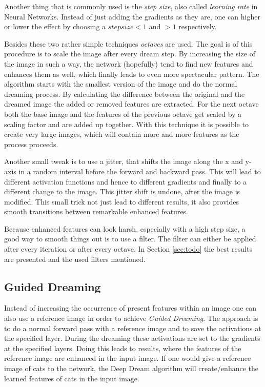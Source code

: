 Another thing that is commonly used is the \emph{step size}, also called \emph{learning rate} in Neural Networks.
Instead of just adding the gradients as they are, one can higher or lower the effect by choosing a $step size < 1$ and $> 1$ respectively.

Besides these two rather simple techniques \emph{octaves} are used.
The goal is of this procedure is to scale the image after every dream step.
By increasing the size of the image in such a way, the network (hopefully) tend to find new features and enhances them as well, which finally leads to even more spectacular pattern.
The algorithm starts with the smallest version of the image and do the normal dreaming process.
By calculating the difference between the original and the dreamed image the added or removed features are extracted.
For the next octave both the base image and the features of the previous octave get scaled by a scaling factor and are added up together.
With this technique it is possible to create very large images, which will contain more and more features as the process proceeds.

 
Another small tweak is to use a jitter, that shifts the image along the x and y-axis in a random interval before the forward and backward pass.
This will lead to different activation functions and hence to different gradients and finally to a different change to the image.
This jitter shift is undone, after the image is modified.
This small trick not just lead to different results, it also provides smooth transitions between remarkable enhanced features.

Because enhanced features can look harsh, especially with a high step size, a good way to smooth things out is to use a filter. The filter can either be applied after every iteration or after every octave.
In Section \ref{sec:todo} the best results are presented and the used filters mentioned.


\subsection{Guided Dreaming}
\label{guided-dreaming}
Instead of increasing the occurrence of present features within an image one can also use a reference image in order to achieve \emph{Guided Dreaming}.
The approach is to do a normal forward pass with a reference image and to save the activations at the specified layer.
During the dreaming these activations are set to the gradients at the specified layers.
Doing this leads to results, where the features of the reference image are enhanced in the input image.
If one would give a reference image of cats to the network, the Deep Dream algorithm will create/enhance the learned features of cats in the input image.

